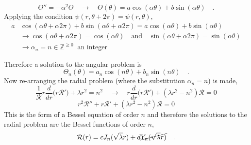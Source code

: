 \documentclass{homework}
\begin{document}
\[ \Theta'' = -\alpha^2 \Theta \quad \rightarrow \quad \Theta (\theta) = a \cos(\alpha \theta) + b \sin(\alpha \theta) \quad .\]
\noindent
Applying the condition $\psi(r, \theta + 2\pi) = \psi(r, \theta)$,
\begin{equation*}
    \begin{split}
        a &\cos(\alpha \theta + \alpha 2 \pi) + b \sin(\alpha \theta + \alpha 2 \pi) = a \cos(\alpha \theta) + b \sin(\alpha \theta) \\
        &\rightarrow  \cos(\alpha \theta + \alpha 2 \pi) = \cos(\alpha \theta) \quad \textrm{and} \quad \sin(\alpha \theta + \alpha 2 \pi) = \sin(\alpha \theta) \\
        &\rightarrow \alpha_n = n \in \mathbb{Z}^{\geq 0} \;\; \textrm{an integer}
    \end{split}
\end{equation*}

\noindent
Therefore a solution to the angular problem is
\[\Theta_n (\theta) = a_n \cos(n \theta) + b_n \sin(n \theta) \quad . \]
\noindent
Now re-arranging the radial problem (where the substitution $\alpha_n = n$) is made,
\[ \frac{1}{\mathcal{R}} r \frac{d}{dr} \big(r \mathcal{R'} \big) + \lambda r^2 = n^2 \quad \rightarrow \quad r \frac{d}{dr} \big(r \mathcal{R'} \big) + (\lambda r^2 - n^2) \mathcal{R} = 0 \]
\[ r^2 \mathcal{R}'' + r \mathcal{R}' + (\lambda r^2 - n^2) \mathcal{R} = 0 \]
\noindent 
This is the form of a Bessel equation of order $n$ and therefore the solutions to the radial problem are the Bessel functions of order $n$,
\[\mathcal{R}(r) = c J_n (\sqrt{\lambda} r) + d \cancel{Y_n (\sqrt{\lambda} r)} \quad .\]
\end{document}

